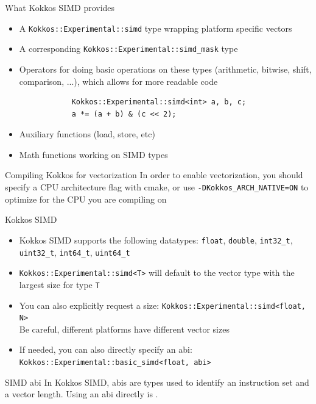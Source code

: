 \documentclass[
    aspectratio=169,
]{beamer}
\begin{document}
\begin{frame}[fragile]{What Kokkos SIMD provides}
    \begin{itemize}
        \item A \texttt{Kokkos::Experimental::simd} type wrapping platform specific vectors
        \item A corresponding \texttt{Kokkos::Experimental::simd\_mask} type
        \item Operators for doing basic operations on these types (arithmetic, bitwise, shift, comparison, ...), which allows for more readable code
        \begin{verbatim}
            Kokkos::Experimental::simd<int> a, b, c;
            a *= (a + b) & (c << 2);
        \end{verbatim}
        \item Auxiliary functions (load, store, etc)
        \item Math functions working on SIMD types
    \end{itemize}

    \vspace{-0.75em}

    \begin{block}{Compiling Kokkos for vectorization}
        In order to enable vectorization, you should specify a CPU architecture flag with cmake, or use \texttt{-DKokkos\_ARCH\_NATIVE=ON} to optimize for the CPU you are compiling on
    \end{block}
\end{frame}

\begin{frame}[fragile]{Kokkos SIMD}
    \begin{itemize}
        \item Kokkos SIMD supports the following datatypes: \texttt{float}, \texttt{double}, \texttt{int32\_t}, \texttt{uint32\_t}, \texttt{int64\_t}, \texttt{uint64\_t}
        \item \texttt{Kokkos::Experimental::simd<T>} will default to the vector type with the largest size for type \texttt{T}
        \item You can also explicitly request a size: \texttt{Kokkos::Experimental::simd<float, N>}\\
        Be careful, different platforms have different vector sizes
        \item If needed, you can also directly specify an abi: \texttt{Kokkos::Experimental::basic\_simd<float, abi>}
    \end{itemize}
    \begin{block}{SIMD abi}
        In Kokkos SIMD, abis are types used to identify an instruction set and a vector length. Using an abi directly is .
    \end{block}
\end{frame}
\end{document}

